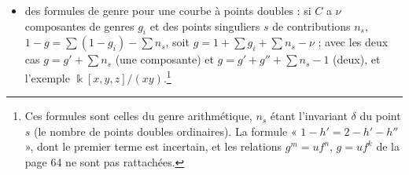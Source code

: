 \documentclass[11pt,a4paper]{article}
\begin{document}
\begin{itemize}
{qu'en dimension $\geq 2$.}
\item des formules de genre pour une courbe à points doubles : si $C$ a $\nu$
composantes de genres $g_i$ et des points singuliers $s$ de contributions
$n_s$, $1 - g = \sum (1 - g_i) - \sum n_s$, soit
$g = 1 + \sum g_i + \sum n_s - \nu$ ; avec les deux cas $g = g' + \sum n_s$
(une composante) et $g = g' + g'' + \sum n_s - 1$ (deux), et l'exemple
$\Bbbk[x, y, z]/(xy)$.\footnote{Ces formules sont celles du genre
arithmétique, $n_s$ étant l'invariant $\delta$ du point $s$ (le nombre de
points doubles ordinaires). La formule « $1 - h' = 2 - h' - h''$ », dont le
premier terme est incertain, et les relations $g^m = u f^n$, $g = u f^k$ de la
page 64 ne sont pas rattachées.}
\end{itemize}
\end{document}
